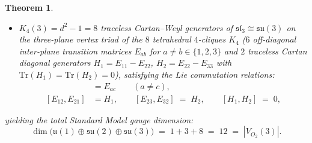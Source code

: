 \documentclass[11pt,a4paper]{article}
\theoremstyle{plain}
\newtheorem{theorem}{Theorem}[section]
\theoremstyle{definition}
\begin{document}
\begin{theorem}
\begin{enumerate}[label=\textbf{(\arabic*)},leftmargin=*]
\begin{itemize}[leftmargin=*]
\begin{equation}
    \end{equation}
    forming the closed Lie algebra $\mathfrak{so}(3) \cong \mathfrak{su}(2)$ with structure constants:
    \begin{equation}
      \label{eq:su2-commutators}
      [L_1, L_2] \;=\; L_3, \qquad
      [L_2, L_3] \;=\; L_1, \qquad
      [L_3, L_1] \;=\; L_2;
    \end{equation}
  \item $K_4(3) = d^2 - 1 = 8$ traceless Cartan--Weyl generators of $\mathfrak{sl}_3 \cong \mathfrak{su}(3)$ on the three-plane vertex triad of the $8$ tetrahedral $4$-cliques $K_4$ ($6$ off-diagonal inter-plane transition matrices $E_{ab}$ for $a \ne b \in \{1,2,3\}$ and $2$ traceless Cartan diagonal generators $H_1 = E_{11} - E_{22}$, $H_2 = E_{22} - E_{33}$ with $\mathrm{Tr}(H_1) = \mathrm{Tr}(H_2) = 0$), satisfying the Lie commutation relations:
    \begin{align}
      [E_{ab}, E_{bc}] &= E_{ac} \qquad (a \ne c), \label{eq:su3-comm-step} \\
      [E_{12}, E_{21}] &= H_1, \qquad [E_{23}, E_{32}] \;=\; H_2, \qquad [H_1, H_2] \;=\; 0, \label{eq:su3-comm-cartan}
    \end{align}
  \end{itemize}
  yielding the total Standard Model gauge dimension:
  \begin{equation}
    \label{eq:sm-gauge-dim-12}
    \dim\bigl(\mathfrak{u}(1)\oplus\mathfrak{su}(2)\oplus\mathfrak{su}(3)\bigr) \;=\; 1 + 3 + 8 \;=\; 12 \;=\; |V_{O_2}(3)|.
  \end{equation}


\end{enumerate}
\end{theorem}
\end{document}
